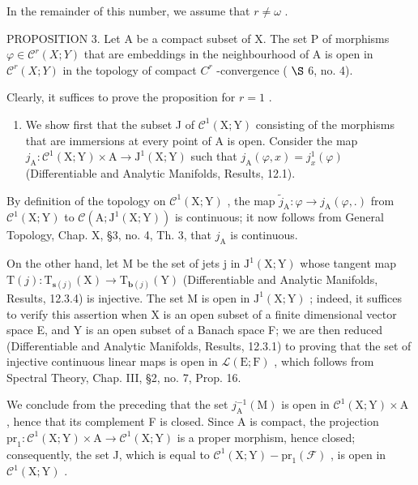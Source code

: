 In the remainder of this number, we assume that \(r \neq \omega\) .

PROPOSITION 3. Let A be a compact subset of X. The set P of morphisms \(\varphi \in \mathcal{C}^{r}(X;Y)\) that are embeddings in the neighbourhood of A is open in \(\mathcal{C}^{r}(X;Y)\) in the topology of compact \(C^{r}\) -convergence ( \(\S\) 6, no. 4).

Clearly, it suffices to prove the proposition for \(r = 1\) .

\begin{enumerate}
\def\labelenumi{\alph{enumi})}
\tightlist
\item
  We show first that the subset J of \(\mathcal{C}^{1}(\mathrm{X};\mathrm{Y})\) consisting of the morphisms that are immersions at every point of A is open. Consider the map \(j_{\mathrm{A}}:\mathcal{C}^{1}(\mathrm{X};\mathrm{Y})\times\mathrm{A}\to\mathrm{J}^{1}(\mathrm{X};\mathrm{Y})\) such that \(j_{\mathrm{A}}(\varphi,x)=j_{x}^{1}(\varphi)\) (Differentiable and Analytic Manifolds, Results, 12.1).
\end{enumerate}

By definition of the topology on \(\mathcal{C}^1 (\mathrm{X};\mathrm{Y})\) , the map \(\tilde{j}_{\mathrm{A}}:\varphi \to j_{\mathrm{A}}(\varphi ,.)\) from \(\mathcal{C}^1 (\mathrm{X};\mathrm{Y})\) to \(\mathcal{C}(\mathrm{A};\mathrm{J}^1 (\mathrm{X};\mathrm{Y}))\) is continuous; it now follows from General Topology, Chap. X, §3, no. 4, Th. 3, that \(j_{\mathrm{A}}\) is continuous.

On the other hand, let M be the set of jets j in \(\mathrm{J}^{1}(\mathrm{X};\mathrm{Y})\) whose tangent map \(\mathrm{T}(j):\mathrm{T}_{\mathbf{s}(j)}(\mathrm{X})\to\mathrm{T}_{\mathbf{b}(j)}(\mathrm{Y})\) (Differentiable and Analytic Manifolds, Results, 12.3.4) is injective. The set M is open in \(\mathrm{J}^{1}(\mathrm{X};\mathrm{Y})\) ; indeed, it suffices to verify this assertion when X is an open subset of a finite dimensional vector space E, and Y is an open subset of a Banach space F; we are then reduced (Differentiable and Analytic Manifolds, Results, 12.3.1) to proving that the set of injective continuous linear maps is open in \(\mathcal{L}(\mathrm{E};\mathrm{F})\) , which follows from Spectral Theory, Chap. III, §2, no. 7, Prop. 16.

We conclude from the preceding that the set \(j_{\mathrm{A}}^{-1}(\mathrm{M})\) is open in \(\mathcal{C}^{1}(\mathrm{X};\mathrm{Y})\times\mathrm{A}\) , hence that its complement F is closed. Since A is compact, the projection \(\mathrm{pr}_{1}:\mathcal{C}^{1}(\mathrm{X};\mathrm{Y})\times\mathrm{A}\to\mathcal{C}^{1}(\mathrm{X};\mathrm{Y})\) is a proper morphism, hence closed; consequently, the set J, which is equal to \(\mathcal{C}^{1}(\mathrm{X};\mathrm{Y})-\mathrm{pr}_{1}(\mathcal{F})\) , is open in \(\mathcal{C}^{1}(\mathrm{X};\mathrm{Y})\) .

